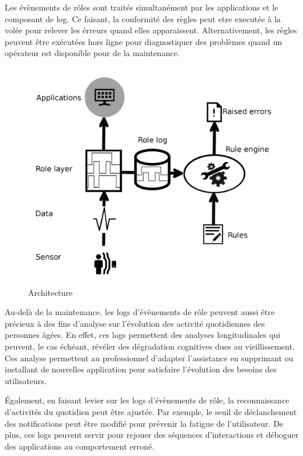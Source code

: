Les évènements de rôles sont traités simultanément par les applications et le composant de log. Ce faisant, la conformité des règles peut etre executée à la volée pour relever les érreurs quand elles apparaissent. Alternativement, les règles peuvent être exécutées hors ligne pour diagnostiquer des problèmes quand un opérateur est disponible pour de la maintenance.

\begin{figure}[!h]
  \centering
  \includegraphics[scale=0.15]{gfx/architecture.png}
  \caption{Architecture}
  \label{fig:archi}
\end{figure}

Au-delà de la maintenance, les logs d'évènements de rôle peuvent aussi être précieux à des fins d'analyse sur l'évolution des activité quotidiennes des personnes âgées. En effet, ces logs permettent des analyses longitudinales qui peuvent, le cas échéant, révéler des dégradation cognitives dues au vieillissement. Ces analyse permettent au professionnel d'adapter l'assistance en supprimant ou installant de nouvelles application pour satisfaire l'évolution des besoins des utilisateurs. 

Également, en faisant levier sur les logs d'évènements de rôle, la reconnaissance d'activités du quotidien peut être ajustée. Par exemple, le seuil de déclanchement des notifications peut être modifié pour prévenir la fatigue de l'utilisateur. De plus, ces logs peuvent servir pour rejouer des séquences d'interactions et déboguer des applications au comportement erroné.


